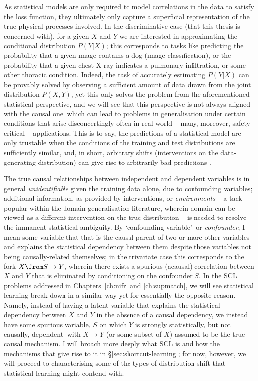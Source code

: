 As statistical models are only required to model correlations in the data to satisfy the loss
function, they ultimately only capture a superficial representation of the true physical processes
involved.
%
%
In the discriminative case (that this thesis is concerned with), for a given \( X \) and \( Y \) we
are interested in approximating the conditional distribution \( P(Y|X) \); this  corresponds to
tasks like predicting the probability that a given image contains a dog (image classification), or
the probability that a given chest X-ray indicates a pulmonary infiltration, or some other thoracic
condition.
%
Indeed, the task of accurately estimating \( P(Y | X) \) can be provably solved by observing a
sufficient amount of \iid{} data drawn from the joint distribution \( P(X,Y) \), yet this only
solves the problem from the aforementioned statistical perspective, and we will see that this
perspective is not always aligned with the causal one, which can lead to problems in generalisation
under certain conditions that arise disconcertingly often in real-world -- many, moreover,
safety-critical -- applications.
%
This is to say, the predictions of a statistical model are only trustable when the conditions of
the training and test distributions are sufficiently similar, and, in short, arbitrary shifts
(interventions on the data-generating distribution) can give rise to arbitrarily bad predictions
\citep{pearl2009causality, scholkopf2012causal}.

The true causal relationships between independent and dependent variables is in general
\emph{unidentifiable} given the training data alone, due to confounding variables; additional
information, as provided by interventions, or \emph{environments} \citep{peters2016causal} -- a
tack popular within the domain generalisation literature, wherein domain can be viewed as a
different intervention on the true distribution -- is needed to resolve the immanent statistical
ambiguity.
%
By `confounding variable', or \emph{confounder}, I mean some variable that that is the causal
parent of two or more other variables and explains the statistical dependency between them despite
those variables not being causally-related themselves; in the trivariate case this corresponds to
the fork \(X \from S \to Y \), wherein there exists a spurious (acausal) correlation between \(X\)
and \(Y\) that is eliminated by conditioning on the confounder \(S\).
%
%
In the \ac{SCL} problems addressed in Chapters~\ref{ch:nifr} and \ref{ch:supmatch}, we will see
statistical learning break down in a similar way yet for essentially the opposite reason.
%
Namely, instead of having a latent variable that explains the statistical dependency between \(X\)
and \(Y\) in the absence of a causal dependency, we instead have some spurious variable, \(S\) on
which \(Y\) is strongly statistically, but not causally, dependent, with \(X \to Y \) (or some
subset of \(X\)) assumed to be the true causal mechanism.
%
I will broach more deeply what \ac{SCL} is and how the mechanisms that give rise to it in
\S\ref{sec:shortcut-learning};
%
for now, however, we will proceed to characterising some of the types of distribution shift that
statistical learning might contend with.

